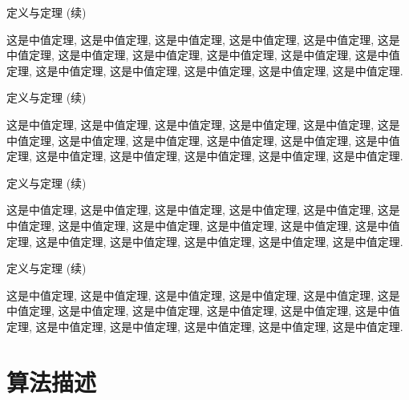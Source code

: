 \documentclass[8pt,compress,t,noamsthm,notheorem,handout,table]{beamer}
\theoremstyle{nonumberplain}%
\theoremstyle{plain}
\begin{document}
\begin{frame}{定义与定理 (续)}
\begin{corollary}[推论1]
	这是中值定理, 这是中值定理, 这是中值定理, 这是中值定理,
	这是中值定理, 这是中值定理, 这是中值定理, 这是中值定理,
	这是中值定理, 这是中值定理, 这是中值定理, 这是中值定理,
	这是中值定理, 这是中值定理, 这是中值定理, 这是中值定理.
\end{corollary}
\end{frame}

\begin{frame}{定义与定理 (续)}
\begin{lemma}[引理1]
这是中值定理, 这是中值定理, 这是中值定理, 这是中值定理,
这是中值定理, 这是中值定理, 这是中值定理, 这是中值定理,
这是中值定理, 这是中值定理, 这是中值定理, 这是中值定理,
这是中值定理, 这是中值定理, 这是中值定理, 这是中值定理.
\end{lemma}
\end{frame}

\begin{frame}{定义与定理 (续)}
\begin{example}[题意]
这是中值定理, 这是中值定理, 这是中值定理, 这是中值定理,
这是中值定理, 这是中值定理, 这是中值定理, 这是中值定理,
这是中值定理, 这是中值定理, 这是中值定理, 这是中值定理,
这是中值定理, 这是中值定理, 这是中值定理, 这是中值定理.
\end{example}
\end{frame}

\begin{frame}{定义与定理 (续)}
\begin{example}[题意1]
这是中值定理, 这是中值定理, 这是中值定理, 这是中值定理,
这是中值定理, 这是中值定理, 这是中值定理, 这是中值定理,
这是中值定理, 这是中值定理, 这是中值定理, 这是中值定理,
这是中值定理, 这是中值定理, 这是中值定理, 这是中值定理.
\end{example}
\end{frame}

\section{算法描述}
\end{document}
